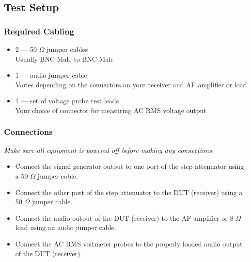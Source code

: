 \documentclass[10pt,letterpaper]{book}
\begin{document}
\subsection*{Test Setup}
\subsubsection*{Required Cabling}
\begin{itemize}
	\item 2 --- 50 $\Omega$ jumper cables \\
		Usually BNC Male-to-BNC Male
	\item 1 --- audio jumper cable \\
		Varies depending on the connectors on your receiver and AF amplifier or load
	\item 1 --- set of voltage probe test leads \\
		Your choice of connector for measuring AC RMS voltage output
\end{itemize}
\subsubsection*{Connections}
\emph{Make sure all equipment is powered off before making any connections.}
\begin{itemize}
	\item Connect the signal generator output to one port of the step attenuator using a 50 $\Omega$ jumper cable.
	\item Connect the other port of the step attenuator to the DUT (receiver) using a 50 $\Omega$ jumper cable.
	\item Connect the audio output of the DUT (receiver) to the AF amplifier or 8 $\Omega$ load using an audio jumper cable.
	\item Connect the AC RMS voltmeter probes to the properly loaded audio output of the DUT (receiver).
\end{itemize}
\end{document}
